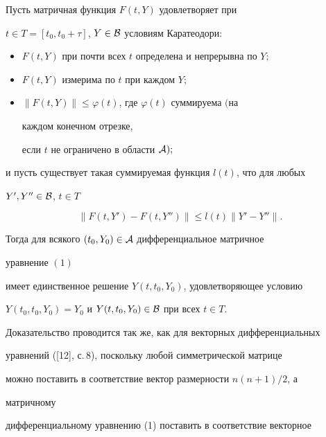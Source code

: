 \begin{thm} 


Пусть матричная функция $F(t,Y)$ удовлетворяет при 


$t\in T=[t_0,t_0+\tau]$, $Y\in\cal B$ условиям Каратеодори$:$ 


\begin{itemize} 


\item[1)] $F(t,Y)$ при почти всех $t$ определена и непрерывна по $Y;$ 


\item[2)] $F(t,Y)$ измерима по $t$ при каждом $Y;$ 


\item[3)] $\|F(t,Y)\|\le\varphi(t)$, где $\varphi(t)$ суммируема $($на 


каждом конечном отрезке, 


если $t$ не ограничено в области $\cal A);$ 


\end{itemize} 


и пусть существует такая суммируемая функция $l(t)$, что для любых 


$Y',Y''\in\cal B$, $t\in T$ 


\begin{equation} 


\|F(t,Y')-F(t,Y'')\|\le l(t)\|Y'-Y''\|. 


\end{equation} 


Тогда для всякого $(t_0,Y_0)\in\cal A$ дифференциальное матричное 


уравнение $(1)$ 


имеет единственное решение $Y(t,t_0,Y_0)$, удовлетворяющее условию 


$Y(t_0,t_0,Y_0)=Y_0$ и $Y(t,t_0,Y_0)\in\cal B$ при всех $t\in T$. 


\end{thm} 


 


Доказательство проводится так же, как для векторных дифференциальных 


уравнений ([12], с.\,8), поскольку любой симметрической матрице 


можно поставить в соответствие вектор размерности $n(n+1)/2$, а 


матричному 


дифференциальному уравнению (1) поставить в соответствие векторное 


